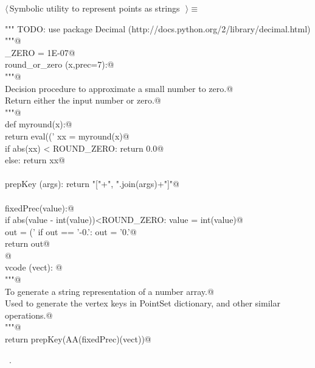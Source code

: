 \documentclass[11pt,oneside]{article}	%
\begin{document}
\begin{flushleft} \small \label{scrap50}
$\langle\,$Symbolic utility to represent points as strings\nobreak\ {\footnotesize {}}$\,\rangle\equiv$
\vspace{-1ex}
\begin{list}{}{} \item
\mbox{}\verb@""" TODO: use package Decimal (http://docs.python.org/2/library/decimal.html) """@\\
\mbox{}\verb@ROUND_ZERO = 1E-07@\\
\mbox{}\verb@def round_or_zero (x,prec=7):@\\
\mbox{}\verb@   """@\\
\mbox{}\verb@   Decision procedure to approximate a small number to zero.@\\
\mbox{}\verb@   Return either the input number or zero.@\\
\mbox{}\verb@   """@\\
\mbox{}\verb@   def myround(x):@\\
\mbox{}\verb@      return eval(('%.'+str(prec)+'f') % round(x,prec))@\\
\mbox{}\verb@   xx = myround(x)@\\
\mbox{}\verb@   if abs(xx) < ROUND_ZERO: return 0.0@\\
\mbox{}\verb@   else: return xx@\\
\mbox{}\verb@@\\
\mbox{}\verb@def prepKey (args): return "["+", ".join(args)+"]"@\\
\mbox{}\verb@@\\
\mbox{}\verb@def fixedPrec(value):@\\
\mbox{}\verb@   if abs(value - int(value))<ROUND_ZERO: value = int(value)@\\
\mbox{}\verb@   out = ('%0.7f'% value).rstrip('0')@\\
\mbox{}\verb@   if out == '-0.': out = '0.'@\\
\mbox{}\verb@   return out@\\
\mbox{}\verb@   @\\
\mbox{}\verb@def vcode (vect): @\\
\mbox{}\verb@   """@\\
\mbox{}\verb@   To generate a string representation of a number array.@\\
\mbox{}\verb@   Used to generate the vertex keys in PointSet dictionary, and other similar operations.@\\
\mbox{}\verb@   """@\\
\mbox{}\verb@   return prepKey(AA(fixedPrec)(vect))@\\
\mbox{}\verb@@{\NWsep}
\end{list}
\vspace{-1ex}
\footnotesize\addtolength{\baselineskip}{-1ex}
\begin{list}{}{\setlength{\itemsep}{-\parsep}\setlength{\itemindent}{-\leftmargin}}
\item \NWtxtMacroRefIn\ .
\end{list}
\end{flushleft}






\end{document}
